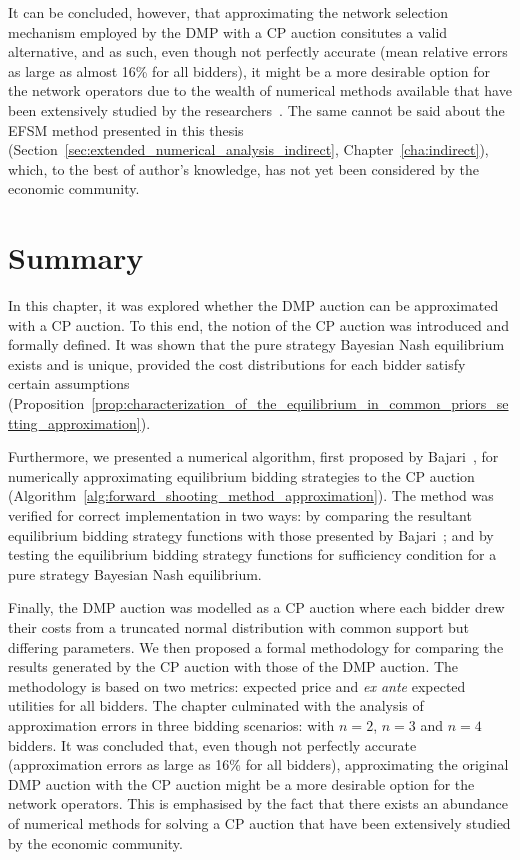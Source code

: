 It can be concluded, however, that approximating the network selection mechanism employed by the DMP with a CP auction consitutes a valid alternative, and as such, even though not perfectly accurate (mean relative errors as large as almost 16\% for all bidders), it might be a more desirable option for the network operators due to the wealth of numerical methods available that have been extensively studied by the researchers~\cite{HubbardPaarsch2011}. The same cannot be said about the EFSM method presented in this thesis (Section~\ref{sec:extended_numerical_analysis_indirect}, Chapter~\ref{cha:indirect}), which, to the best of author's knowledge, has not yet been considered by the economic community.

\section{Summary} %
\label{sec:summary_approximation}
In this chapter, it was explored whether the DMP auction can be approximated with a CP auction. To this end, the notion of the CP auction was introduced and formally defined. It was shown that the pure strategy Bayesian Nash equilibrium exists and is unique, provided the cost distributions for each bidder satisfy certain assumptions (Proposition~\ref{prop:characterization_of_the_equilibrium_in_common_priors_setting_approximation}).

Furthermore, we presented a numerical algorithm, first proposed by Bajari~\cite{Bajari2001a}, for numerically approximating equilibrium bidding strategies to the CP auction (Algorithm~\ref{alg:forward_shooting_method_approximation}). The method was verified for correct implementation in two ways: by comparing the resultant equilibrium bidding strategy functions with those presented by Bajari~\cite{Bajari2001a}; and by testing the equilibrium bidding strategy functions for sufficiency condition for a pure strategy Bayesian Nash equilibrium.

Finally, the DMP auction was modelled as a CP auction where each bidder drew their costs from a truncated normal distribution with common support but differing parameters. We then proposed a formal methodology for comparing the results generated by the CP auction with those of the DMP auction. The methodology is based on two metrics: expected price and \emph{ex ante} expected utilities for all bidders. The chapter culminated with the analysis of approximation errors in three bidding scenarios: with $n=2$, $n=3$ and $n=4$ bidders. It was concluded that, even though not perfectly accurate (approximation errors as large as 16\% for all bidders), approximating the original DMP auction with the CP auction might be a more desirable option for the network operators. This is emphasised by the fact that there exists an abundance of numerical methods for solving a CP auction that have been extensively studied by the economic community.


